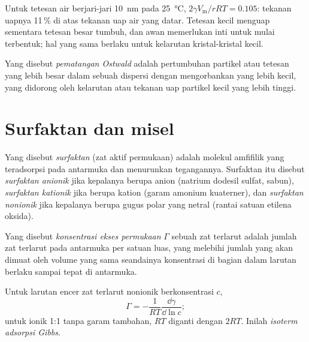 Untuk tetesan air berjari-jari \qty{10}{nm} pada \qty{25}{\celsius}, $2\gamma V_{\mathrm m}/rRT = 0.105$: tekanan
uapnya 11\,\% di atas tekanan uap air yang datar. Tetesan kecil menguap
sementara tetesan besar tumbuh, dan awan memerlukan inti untuk mulai
terbentuk; hal yang sama berlaku untuk kelarutan kristal-kristal kecil.

\begin{definition}\label{def:b3:colloids:ripening}
Yang disebut \emph{pematangan Ostwald} adalah pertumbuhan
partikel atau tetesan yang lebih besar dalam sebuah dispersi dengan
mengorbankan yang lebih kecil, yang didorong oleh kelarutan atau tekanan uap
partikel kecil yang lebih tinggi.
\end{definition}

\section{Surfaktan dan misel}

\begin{definition}[Surfaktan]\label{def:b3:colloids:surfactant}
Yang disebut \emph{surfaktan} (zat aktif permukaan) adalah molekul amfifilik
yang teradsorpsi pada antarmuka dan menurunkan tegangannya. Surfaktan itu
disebut \emph{surfaktan anionik} jika kepalanya berupa
anion (natrium dodesil sulfat, sabun), \emph{surfaktan kationik}
jika berupa kation (garam amonium kuaterner), dan \emph{surfaktan
nonionik} jika kepalanya berupa gugus polar yang netral
(rantai satuan etilena oksida).
\end{definition}

\begin{definition}\label{def:b3:colloids:surface-excess}
Yang disebut \emph{konsentrasi ekses permukaan} $\Gamma$ sebuah
zat terlarut adalah jumlah zat terlarut pada antarmuka per satuan luas, yang
melebihi jumlah yang akan dimuat oleh volume yang sama seandainya konsentrasi
di bagian dalam larutan berlaku sampai tepat di antarmuka.
\end{definition}

\begin{theorem}\label{thm:b3:colloids:gibbs-adsorption}
Untuk larutan encer zat terlarut nonionik berkonsentrasi $c$,
\[
  \Gamma = -\frac{1}{RT}\frac{\dd\gamma}{\dd\ln c};
\]
untuk  ionik 1:1 tanpa garam tambahan, $RT$ diganti dengan $2RT$. Inilah
\emph{isoterm adsorpsi Gibbs}.
\end{theorem}

